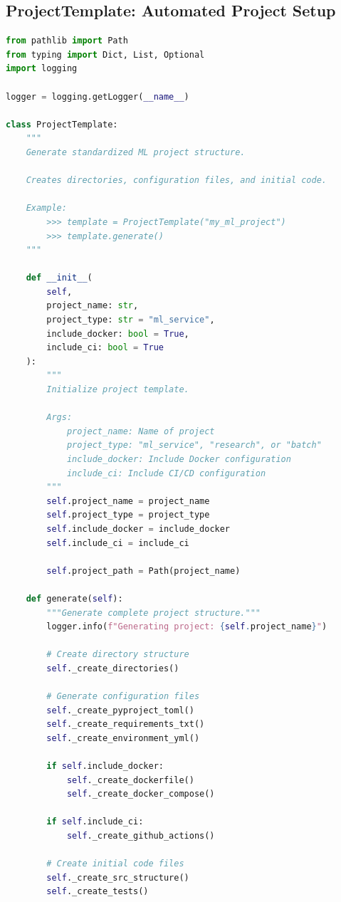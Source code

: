 \subsection{ProjectTemplate: Automated Project Setup}

\begin{lstlisting}[language=Python, caption={ML Project Template Generator}]
from pathlib import Path
from typing import Dict, List, Optional
import logging

logger = logging.getLogger(__name__)

class ProjectTemplate:
    """
    Generate standardized ML project structure.

    Creates directories, configuration files, and initial code.

    Example:
        >>> template = ProjectTemplate("my_ml_project")
        >>> template.generate()
    """

    def __init__(
        self,
        project_name: str,
        project_type: str = "ml_service",
        include_docker: bool = True,
        include_ci: bool = True
    ):
        """
        Initialize project template.

        Args:
            project_name: Name of project
            project_type: "ml_service", "research", or "batch"
            include_docker: Include Docker configuration
            include_ci: Include CI/CD configuration
        """
        self.project_name = project_name
        self.project_type = project_type
        self.include_docker = include_docker
        self.include_ci = include_ci

        self.project_path = Path(project_name)

    def generate(self):
        """Generate complete project structure."""
        logger.info(f"Generating project: {self.project_name}")

        # Create directory structure
        self._create_directories()

        # Generate configuration files
        self._create_pyproject_toml()
        self._create_requirements_txt()
        self._create_environment_yml()

        if self.include_docker:
            self._create_dockerfile()
            self._create_docker_compose()

        if self.include_ci:
            self._create_github_actions()

        # Create initial code files
        self._create_src_structure()
        self._create_tests()


\end{lstlisting}
